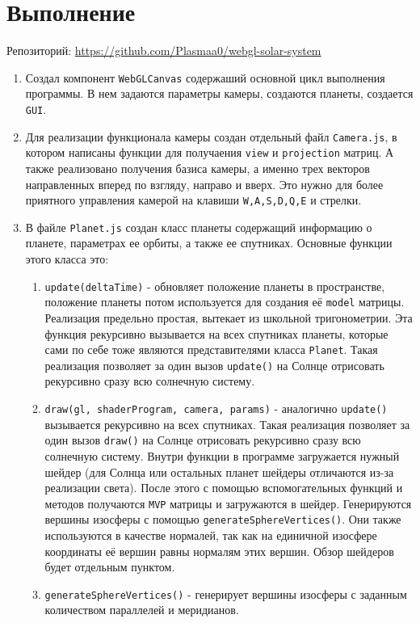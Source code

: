 \documentclass{bmstu}
\begin{document}
	\chapter{Выполнение}
	Репозиторий: \url{https://github.com/Plasmaa0/webgl-solar-system}
	\begin{enumerate}
		\item Создал компонент \verb|WebGLCanvas| содержаший основной цикл выполнения программы. В нем задаются параметры камеры, создаются планеты, создается \verb|GUI|.
		
		\item Для реализации функционала камеры создан отдельный файл \verb*|Camera.js|, в котором написаны функции для получаения \verb*|view| и \verb*|projection| матриц. А также реализовано получения базиса камеры, а именно трех векторов направленных вперед по взгляду, направо и вверх. Это нужно для более приятного управления камерой на клавиши \verb*|W,A,S,D,Q,E| и стрелки.
		
		\item В файле \verb|Planet.js| создан класс планеты содержащий информацию о планете, параметрах ее орбиты, а также ее спутниках. Основные функции этого класса это:
		\begin{enumerate}
			\item \verb|update(deltaTime)| - обновляет положение планеты в пространстве, положение планеты потом используется для создания её \verb|model| матрицы. Реализация предельно простая, вытекает из школьной тригонометрии. Эта функция рекурсивно вызывается на всех спутниках планеты, которые сами по себе тоже являются представителями класса \verb|Planet|. Такая реализация позволяет за один вызов \verb|update()| на Солнце отрисовать рекурсивно сразу всю солнечную систему.
			\item \verb|draw(gl, shaderProgram, camera, params)| - аналогично \verb|update()| вызывается рекурсивно на всех спутниках. Такая реализация позволяет за один вызов \verb|draw()| на Солнце отрисовать рекурсивно сразу всю солнечную систему. Внутри функции в программе загружается нужный шейдер (для Солнца или остальных планет шейдеры отличаются из-за реализации света). После этого с помощью вспомогательных функций и методов получаются \verb|MVP| матрицы и загружаются в шейдер. Генерируются вершины изосферы с помощью \verb|generateSphereVertices()|. Они также используются в качестве нормалей, так как на единичной изосфере координаты её вершин равны нормалям этих вершин. Обзор шейдеров будет отдельным пунктом.
			\item \verb|generateSphereVertices()| - генерирует вершины изосферы с заданным количеством параллелей и меридианов.
		\end{enumerate}
		

\end{enumerate}
\end{document}
